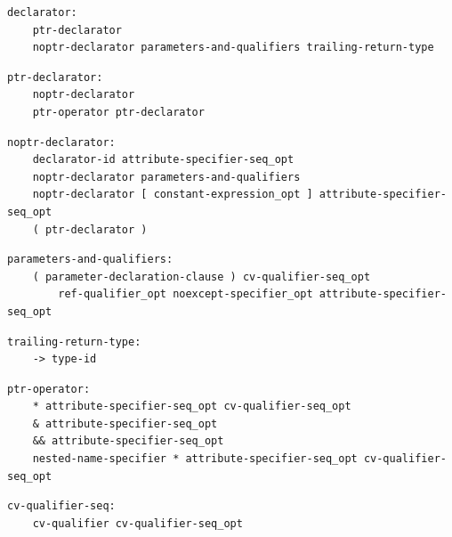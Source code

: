 \noindent\textbf{\texttt{}}\par
\begin{lstlisting}
declarator:
    ptr-declarator
    noptr-declarator parameters-and-qualifiers trailing-return-type
\end{lstlisting}

\noindent\textbf{\texttt{}}\par
\begin{lstlisting}
ptr-declarator:
    noptr-declarator
    ptr-operator ptr-declarator
\end{lstlisting}

\noindent\textbf{\texttt{}}\par
\begin{lstlisting}
noptr-declarator:
    declarator-id attribute-specifier-seq_opt
    noptr-declarator parameters-and-qualifiers
    noptr-declarator [ constant-expression_opt ] attribute-specifier-seq_opt
    ( ptr-declarator )
\end{lstlisting}

\noindent\textbf{\texttt{}}\par
\begin{lstlisting}
parameters-and-qualifiers:
    ( parameter-declaration-clause ) cv-qualifier-seq_opt
        ref-qualifier_opt noexcept-specifier_opt attribute-specifier-seq_opt
\end{lstlisting}

\noindent\textbf{\texttt{}}\par
\begin{lstlisting}
trailing-return-type:
    -> type-id
\end{lstlisting}

\noindent\textbf{\texttt{}}\par
\begin{lstlisting}
ptr-operator:
    * attribute-specifier-seq_opt cv-qualifier-seq_opt
    & attribute-specifier-seq_opt
    && attribute-specifier-seq_opt
    nested-name-specifier * attribute-specifier-seq_opt cv-qualifier-seq_opt
\end{lstlisting}

\noindent\textbf{\texttt{}}\par
\begin{lstlisting}
cv-qualifier-seq:
    cv-qualifier cv-qualifier-seq_opt
\end{lstlisting}


